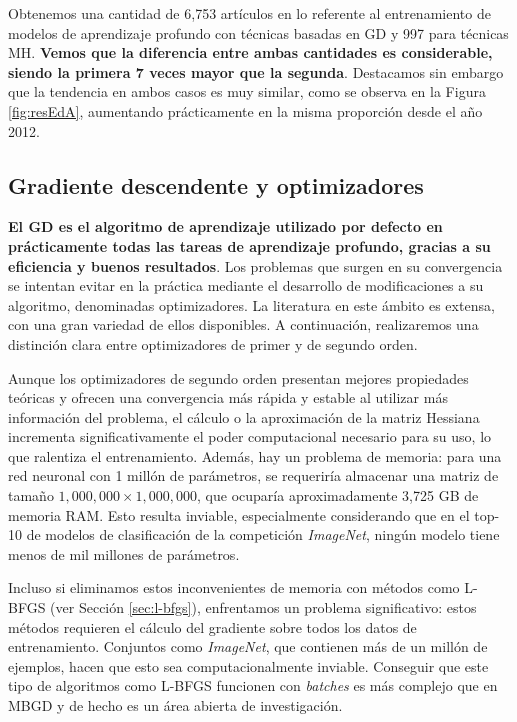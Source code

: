 Obtenemos una cantidad de 6,753 artículos en lo referente al entrenamiento de modelos de aprendizaje profundo con técnicas basadas en GD y 997 para técnicas MH. \textbf{Vemos que la diferencia entre ambas cantidades es considerable, siendo la primera 7 veces mayor que la segunda}. Destacamos sin embargo que la tendencia en ambos casos es muy similar, como se observa en la Figura \ref{fig:resEdA}, aumentando prácticamente en la misma proporción desde el año 2012.



\subsection{Gradiente descendente y optimizadores}

\textbf{El GD es el algoritmo de aprendizaje utilizado por defecto en prácticamente todas las tareas de aprendizaje profundo, gracias a su eficiencia y buenos resultados}. Los problemas que surgen en su convergencia se intentan evitar en la práctica mediante el desarrollo de modificaciones a su algoritmo, denominadas optimizadores. La literatura en este ámbito es extensa, con una gran variedad de ellos disponibles. A continuación, realizaremos una distinción clara entre optimizadores de primer y de segundo orden.


Aunque los optimizadores de segundo orden presentan mejores propiedades teóricas y ofrecen una convergencia más rápida y estable al utilizar más información del problema, el cálculo o la aproximación de la matriz Hessiana incrementa significativamente el poder computacional necesario para su uso, lo que ralentiza el entrenamiento. Además, hay un problema de memoria: para una red neuronal con 1 millón de parámetros, se requeriría almacenar una matriz de tamaño $1,000,000 \times 1,000,000$, que ocuparía aproximadamente 3,725 GB de memoria RAM. Esto resulta inviable, especialmente considerando que en el top-10 de modelos de clasificación de la competición \textit{ImageNet}, ningún modelo tiene menos de mil millones de parámetros.

Incluso si eliminamos estos inconvenientes de memoria con métodos como L-BFGS (ver Sección \ref{sec:l-bfgs}), enfrentamos un problema significativo: estos métodos requieren el cálculo del gradiente sobre todos los datos de entrenamiento. Conjuntos como \textit{ImageNet}, que contienen más de un millón de ejemplos, hacen que esto sea computacionalmente inviable. Conseguir que este tipo de algoritmos como L-BFGS funcionen con \textit{batches} es más complejo que en MBGD y de hecho es un área abierta de investigación.

